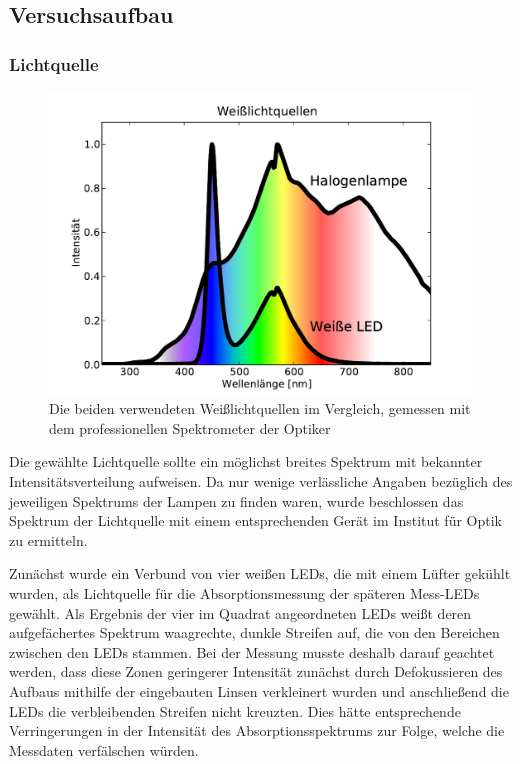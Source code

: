 \documentclass[11pt]{scrartcl}
\begin{document}
\subsection{Versuchsaufbau}
\subsubsection{Lichtquelle} %

\begin{figure}[!b]
\begin{center}
\includegraphics[width=1\textwidth]{quellspektren.pdf}
\end{center}
\vspace{-1.5\baselineskip}
\caption{Die beiden verwendeten Weißlichtquellen im Vergleich, gemessen mit dem professionellen Spektrometer der Optiker}
\label{fig:lichtquelle}
\end{figure}

Die gew\"ahlte Lichtquelle sollte ein m\"oglichst breites Spektrum mit bekannter Intensit\"atsverteilung aufweisen. Da nur wenige verlässliche Angaben bez\"uglich des jeweiligen Spektrums der Lampen zu finden waren, wurde beschlossen das Spektrum der Lichtquelle mit einem entsprechenden Ger\"at im Institut f\"ur Optik zu ermitteln.

Zun\"achst wurde ein Verbund von vier wei\ss{}en LEDs, die mit einem L\"ufter gek\"uhlt wurden, als Lichtquelle f\"ur die Absorptionsmessung der sp\"ateren Mess-LEDs gew\"ahlt. Als Ergebnis der vier im Quadrat angeordneten LEDs wei\ss{}t deren aufgef\"achertes Spektrum waagrechte, dunkle Streifen auf, die von den Bereichen zwischen den LEDs stammen. Bei der Messung musste deshalb darauf geachtet werden, dass diese Zonen geringerer Intensit\"at zun\"achst durch Defokussieren des Aufbaus mithilfe der eingebauten Linsen verkleinert wurden und anschlie\ss{}end die LEDs die verbleibenden Streifen nicht kreuzten. Dies h\"atte entsprechende Verringerungen in der Intensit\"at des Absorptionsspektrums zur Folge, welche die Messdaten verf\"alschen w\"urden.
\end{document}
